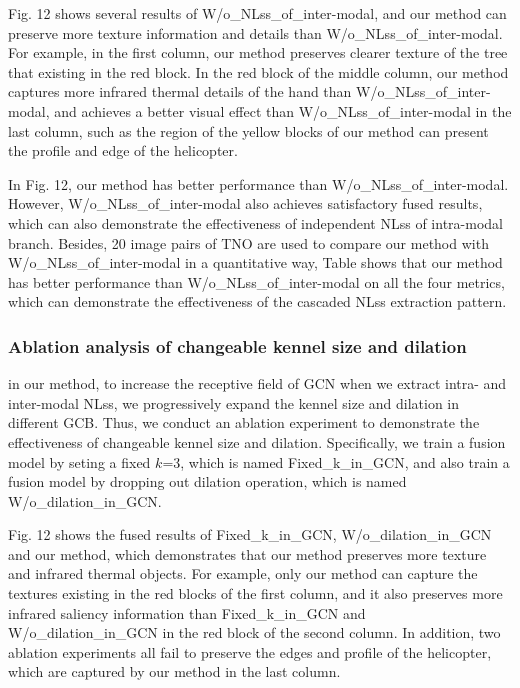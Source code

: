 \documentclass[journal]{IEEEtran}
\begin{document}
Fig. 12 shows several results of W/o\_NLss\_of\_inter-modal, and our method can preserve more texture information and details than W/o\_NLss\_of\_inter-modal. For example, in the first column, our method preserves clearer texture of the tree that existing in the red block. In the red block of the middle column, our method captures more infrared thermal details of the hand than W/o\_NLss\_of\_inter-modal, and achieves a better visual effect than W/o\_NLss\_of\_inter-modal in the last column, such as the region of the yellow blocks of our method can present the profile and edge of the helicopter. 

In Fig. 12, our method has better performance than W/o\_NLss\_of\_inter-modal. However, W/o\_NLss\_of\_inter-modal also achieves satisfactory fused results, which can also demonstrate the effectiveness of independent NLss of intra-modal branch. Besides, 20 image pairs of TNO are used to compare our method with W/o\_NLss\_of\_inter-modal in a quantitative way, Table \uppercase\expandafter{} shows that our method has better performance than W/o\_NLss\_of\_inter-modal on all the four metrics, which can demonstrate the effectiveness of the cascaded NLss extraction pattern.

\subsubsection{Ablation analysis of changeable kennel size and dilation}
in our method, to increase the receptive field of GCN when we extract intra- and inter-modal NLss, we progressively expand the kennel size and dilation in different GCB. Thus, we conduct an ablation experiment to demonstrate the effectiveness of changeable kennel size and dilation. Specifically, we train a fusion model by seting a fixed $k$=3, which is named Fixed\_k\_in\_GCN, and also train a fusion model by dropping out dilation operation, which is named W/o\_dilation\_in\_GCN.

Fig. 12 shows the fused results of Fixed\_k\_in\_GCN, W/o\_dilation\_in\_GCN and our method, which demonstrates that our method preserves more texture and infrared thermal objects. For example, only our method can capture the textures existing in the red blocks of the first column, and it also preserves more infrared saliency information than Fixed\_k\_in\_GCN and W/o\_dilation\_in\_GCN in the red block of the second column. In addition, two ablation experiments all fail to preserve the edges and profile of the helicopter, which are captured by our method in the last column.
\end{document}
